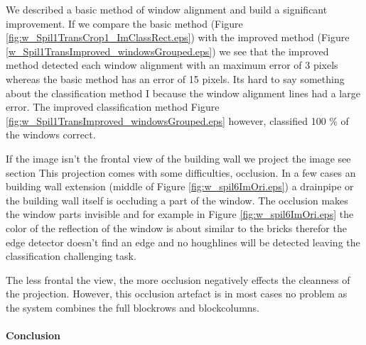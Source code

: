 We described a basic method of window alignment and build a significant improvement.
If we compare the basic method (Figure \ref{fig:w_Spil1TransCrop1_ImClassRect.eps})
with the improved method (Figure \ref{w_Spil1TransImproved_windowsGrouped.eps})
we see that the improved method detected each window alignment with an maximum
error of 3 pixels whereas the basic method has an error of 15 pixels.  Its hard
to say something about the classification method I because the window alignment
lines had a large error.
The improved classification method Figure
\ref{fig:w_Spil1TransImproved_windowsGrouped.eps} however, classified 100 \% of
the windows correct.



\label{lab:occlusion}
If the image isn't the frontal view of the building wall we project the image 
see section 
This projection comes with some difficulties, occlusion.  In a few cases an
building wall extension (middle of Figure \ref{fig:w_spil6ImOri.eps}) a drainpipe
or the building wall itself is occluding a part of the window.  
The occlusion makes the window parts invisible and for example in Figure
\ref{fig:w_spil6ImOri.eps} the color of the reflection of the window is about
similar to the bricks therefor the edge detector doesn't find an edge and no
houghlines will be detected leaving the classification challenging task.

The less frontal
the view, the more occlusion negatively effects the cleanness of the projection.
However, this occlusion artefact is in most cases no problem as the system
combines the full blockrows and blockcolumns.  


\paragraph{Conclusion} %

